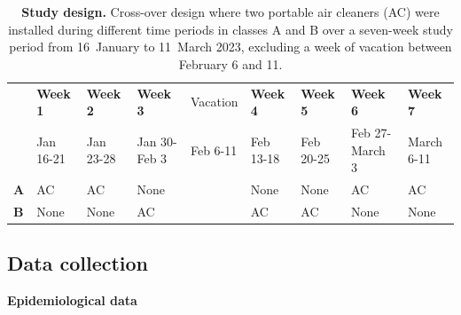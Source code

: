 \documentclass[fleqn,11pt]{wlscirep}
\begin{document}
\begin{table}[!htpb]
    \footnotesize
    \centering
    \caption{\textbf{Study design.} Cross-over design where two portable air cleaners (AC) were installed during different time periods in classes A and B over a seven-week study period from 16~January to 11~March 2023, excluding a week of vacation between February 6 and 11.}
    \begin{tabular}{l l l l l l l l l}
    \toprule
      & \textbf{Week 1} & \textbf{Week 2} & \textbf{Week 3} & Vacation & \textbf{Week 4} & \textbf{Week 5} & \textbf{Week 6} & \textbf{Week 7} \\
      & Jan 16-21 & Jan 23-28 & Jan 30-Feb 3 & Feb 6-11 & Feb 13-18 & Feb 20-25 & Feb 27-March 3 & March 6-11 \\
      \midrule
      \textbf{A} & \cellcolor{gray!50} AC & \cellcolor{gray!50} AC & \cellcolor{gray!10} None & & \cellcolor{gray!10} None & \cellcolor{gray!10} None & \cellcolor{gray!50} AC & \cellcolor{gray!50} AC \\
      \textbf{B} & \cellcolor{gray!10} None & \cellcolor{gray!10} None & \cellcolor{gray!50} AC & & \cellcolor{gray!50} AC & \cellcolor{gray!50} AC & \cellcolor{gray!10} None & \cellcolor{gray!10} None \\
      \bottomrule
    \end{tabular}
    \label{tab:study_design}
\end{table}
 
\subsection{Data collection}

\noindent\textbf{Epidemiological data} \smallskip
\end{document}
